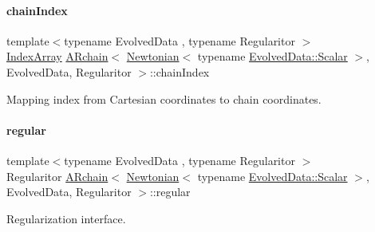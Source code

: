 \paragraph{\texorpdfstring{chain\+Index}{chainIndex}}
{\footnotesize\ttfamily template$<$typename Evolved\+Data , typename Regularitor $>$ \\
\mbox{\hyperlink{class_a_rchain_3_01_newtonian_3_01typename_01_evolved_data_1_1_scalar_01_4_00_01_evolved_data_00_01_regularitor_01_4_a0072f8585c3e6ba8d64cb81be90fb376}{Index\+Array}} \mbox{\hyperlink{class_a_rchain}{A\+Rchain}}$<$ \mbox{\hyperlink{class_newtonian}{Newtonian}}$<$ typename \mbox{\hyperlink{class_a_rchain_a707e42a79e4744424a34c9007e84ee07}{Evolved\+Data\+::\+Scalar}} $>$, Evolved\+Data, Regularitor $>$\+::chain\+Index\hspace{0.3cm}{\ttfamily [private]}}



Mapping index from Cartesian coordinates to chain coordinates. 

\mbox{\label{class_a_rchain_3_01_newtonian_3_01typename_01_evolved_data_1_1_scalar_01_4_00_01_evolved_data_00_01_regularitor_01_4_a6e5a31aa07620ab9f3503ebc412ff969}} 
\paragraph{\texorpdfstring{regular}{regular}}
{\footnotesize\ttfamily template$<$typename Evolved\+Data , typename Regularitor $>$ \\
Regularitor \mbox{\hyperlink{class_a_rchain}{A\+Rchain}}$<$ \mbox{\hyperlink{class_newtonian}{Newtonian}}$<$ typename \mbox{\hyperlink{class_a_rchain_a707e42a79e4744424a34c9007e84ee07}{Evolved\+Data\+::\+Scalar}} $>$, Evolved\+Data, Regularitor $>$\+::regular\hspace{0.3cm}{\ttfamily [private]}}



Regularization interface. 

